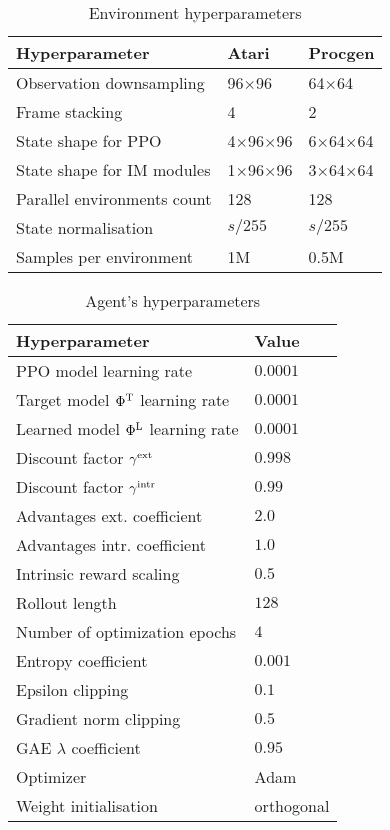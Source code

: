\documentclass[a4paper,11pt]{elsarticle}
\begin{document}
\begin{table}[thb]
\scriptsize
\centering
\caption{Environment hyperparameters}
  \begin{tabular}{l|ll}
      Hyperparameter & Atari & Procgen  \\ 
      \hline\hline
      Observation downsampling & 96$\times$96 & 64$\times$64 \\
      Frame stacking & 4 & 2 \\
      State shape for PPO & 4$\times$96$\times$96 & 6$\times$64$\times$64 \\
      State shape for IM modules & 1$\times$96$\times$96 & 3$\times$64$\times$64 \\
      Parallel environments count & 128 & 128 \\
      State normalisation & $s/255$ & $s/255$ \\
      Samples per environment & 1M & 0.5M \\
      \hline
  \end{tabular}\label{tab:env_hyperparameters}
\end{table}

\begin{table}[thb]
\scriptsize
\centering
\caption{Agent's hyperparameters}
    \begin{tabular}{l|l}
        Hyperparameter & Value \\ 
        \hline\hline
        PPO model learning rate & $0.0001$ \\
        Target model $\Phi^{\rm T}$ learning rate & $0.0001$ \\
        Learned model $\Phi^{\rm L}$ learning rate & $0.0001$ \\
        Discount factor $\gamma^{\rm ext}$ & $0.998$ \\
        Discount factor $\gamma^{\rm intr}$ & $0.99$ \\
        Advantages ext. coefficient & $2.0$ \\
        Advantages intr. coefficient & $1.0$ \\
        Intrinsic reward scaling & $0.5$ \\
        Rollout length & $128$ \\ 
        Number of optimization epochs & $4$ \\
        Entropy coefficient & $0.001$ \\
        Epsilon clipping & $0.1$ \\
        Gradient norm clipping & $0.5$ \\
        GAE $\lambda$ coefficient & $0.95$ \\
        Optimizer & Adam \\
        Weight initialisation & orthogonal \\
        \hline
    \end{tabular}
    \label{tab:agent_hyperparameters}
\end{table}
\end{document}
